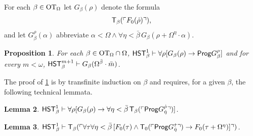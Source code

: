 \documentclass[UKenglish,cleveref,DIV=12]{scrartcl}
\newtheorem{lemma}{Lemma}[section]
\newtheorem{proposition}[lemma]{Proposition}
\theoremstyle{definition}
\theoremstyle{definition}
\begin{document}
For each $\beta\in\mathrm{OT}_\Omega$ let $G_\beta(\rho)$ denote the formula
\begin{align*}
  \mathsf{T}_{\beta}(\ulcorner{F_0(\dot\rho)}\urcorner),
\end{align*}
and let $G_\beta^\rho(\alpha)$ abbreviate $\alpha<\Omega\land \forall\eta<\bar\beta\,G_\beta(\rho+\Omega^\eta\cdot\alpha)$.
\begin{proposition}\label{lem:Fbetawellordering1}
 For each $\beta\in\mathrm{OT}_\Omega\cap\Omega$, $\mathsf{HST}_{\beta}^1\vdash \forall\rho[G_\beta(\rho)\rightarrow \mathsf{Prog} G_\beta^\rho]$ and for every $m<\omega$, $\mathsf{HST}_{\beta}^{m+1}\vdash G_\beta(\Omega^{\bar\beta}\cdot\bar m)$.
\end{proposition}
The proof of \cref{lem:Fbetawellordering1} is by transfinite induction on
$\beta$ and requires, for a given $\beta$, the following technical lemmata.
\begin{lemma}\label{lem:Fbetatech1}
 $\mathsf{HST}_\beta^1\vdash \forall\rho[G_\beta(\rho)\rightarrow \forall\eta<\bar\beta\,\mathsf{T}_\beta(\ulcorner{\mathsf{Prog}G_{\dot\eta}^{\dot\rho}}\urcorner)]$.
\end{lemma}
\begin{lemma}\label{lem:Fbetatech2}
  $\mathsf{HST}_\beta^1\vdash \mathsf{T}_\beta(\ulcorner{\forall\tau\forall\eta<\bar\beta\,[F_0(\tau)\land\mathsf{T}_0(\ulcorner{\mathsf{Prog}G_{\dot\eta}^{\dot\tau}}\urcorner) \rightarrow
  F_0(\tau+\Omega^{\eta})]}\urcorner)$.
\end{lemma}
\end{document}
